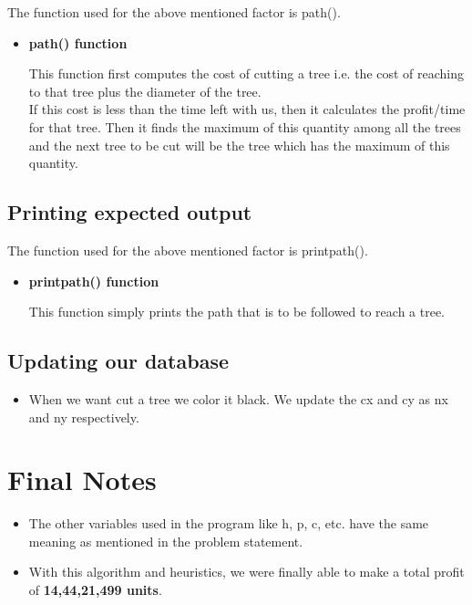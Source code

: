 \documentclass[12pt]{article}
\begin{document}
The function used for the above mentioned factor is path().
    \begin{itemize}
        \item \textbf{path() function}
            
            This function first computes the cost of cutting a tree i.e. the cost of reaching to that tree plus the diameter of the tree. \\
            
            If this cost is less than the time left with us, then it calculates the profit/time for that tree. Then it finds the maximum of this quantity among all the trees and the next tree to be cut will be the tree which has the maximum of this quantity.\\
    \end{itemize}

\subsection{Printing expected output}
    The function used for the above mentioned factor is print\textunderscore path().
    
        \begin{itemize}
            \item \textbf{print\textunderscore path() function}
            
                This function simply prints the path that is to be followed to reach a tree.\\
                
        \end{itemize}

\subsection {Updating our database} 
		\begin{itemize}
			\item When we want cut a tree we color it black. We update the c\textunderscore x and c\textunderscore y as n\textunderscore x and n\textunderscore y respectively. \\
		\end{itemize}

\section{Final Notes}
    \begin{itemize}
        \item The other variables used in the program like h, p, c, etc. have the same meaning as mentioned in the problem statement.
        \item With this algorithm and heuristics, we were finally able to make a total profit of \textbf{14,44,21,499 units}.
    \end{itemize}
        
\end{document}
